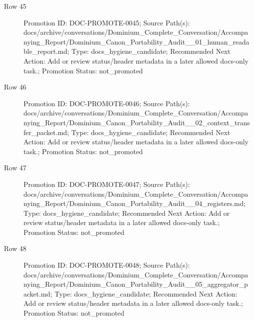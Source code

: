 \documentclass[9pt,a4paper,openany]{book}
\begin{document}
\begin{description}
\item[Row 45] Promotion ID: DOC-\allowbreak{}PROMOTE-\allowbreak{}0045; Source Path(s): docs/\allowbreak{}archive/\allowbreak{}conversations/\allowbreak{}Dominium\_\allowbreak{}Complete\_\allowbreak{}Conversation/\allowbreak{}Accompanying\_\allowbreak{}Report/\allowbreak{}Dominium\_\allowbreak{}Canon\_\allowbreak{}Portability\_\allowbreak{}Audit\_\allowbreak{}\_\allowbreak{}01\_\allowbreak{}human\_\allowbreak{}readable\_\allowbreak{}report.\allowbreak{}md; Type: docs\_\allowbreak{}hygiene\_\allowbreak{}candidate; Recommended Next Action: Add or review status/\allowbreak{}header metadata in a later allowed docs-\allowbreak{}only task.\allowbreak{}; Promotion Status: not\_\allowbreak{}promoted
\item[Row 46] Promotion ID: DOC-\allowbreak{}PROMOTE-\allowbreak{}0046; Source Path(s): docs/\allowbreak{}archive/\allowbreak{}conversations/\allowbreak{}Dominium\_\allowbreak{}Complete\_\allowbreak{}Conversation/\allowbreak{}Accompanying\_\allowbreak{}Report/\allowbreak{}Dominium\_\allowbreak{}Canon\_\allowbreak{}Portability\_\allowbreak{}Audit\_\allowbreak{}\_\allowbreak{}02\_\allowbreak{}context\_\allowbreak{}transfer\_\allowbreak{}packet.\allowbreak{}md; Type: docs\_\allowbreak{}hygiene\_\allowbreak{}candidate; Recommended Next Action: Add or review status/\allowbreak{}header metadata in a later allowed docs-\allowbreak{}only task.\allowbreak{}; Promotion Status: not\_\allowbreak{}promoted
\item[Row 47] Promotion ID: DOC-\allowbreak{}PROMOTE-\allowbreak{}0047; Source Path(s): docs/\allowbreak{}archive/\allowbreak{}conversations/\allowbreak{}Dominium\_\allowbreak{}Complete\_\allowbreak{}Conversation/\allowbreak{}Accompanying\_\allowbreak{}Report/\allowbreak{}Dominium\_\allowbreak{}Canon\_\allowbreak{}Portability\_\allowbreak{}Audit\_\allowbreak{}\_\allowbreak{}04\_\allowbreak{}registers.\allowbreak{}md; Type: docs\_\allowbreak{}hygiene\_\allowbreak{}candidate; Recommended Next Action: Add or review status/\allowbreak{}header metadata in a later allowed docs-\allowbreak{}only task.\allowbreak{}; Promotion Status: not\_\allowbreak{}promoted
\item[Row 48] Promotion ID: DOC-\allowbreak{}PROMOTE-\allowbreak{}0048; Source Path(s): docs/\allowbreak{}archive/\allowbreak{}conversations/\allowbreak{}Dominium\_\allowbreak{}Complete\_\allowbreak{}Conversation/\allowbreak{}Accompanying\_\allowbreak{}Report/\allowbreak{}Dominium\_\allowbreak{}Canon\_\allowbreak{}Portability\_\allowbreak{}Audit\_\allowbreak{}\_\allowbreak{}05\_\allowbreak{}aggregator\_\allowbreak{}packet.\allowbreak{}md; Type: docs\_\allowbreak{}hygiene\_\allowbreak{}candidate; Recommended Next Action: Add or review status/\allowbreak{}header metadata in a later allowed docs-\allowbreak{}only task.\allowbreak{}; Promotion Status: not\_\allowbreak{}promoted

\end{description}
\end{document}
